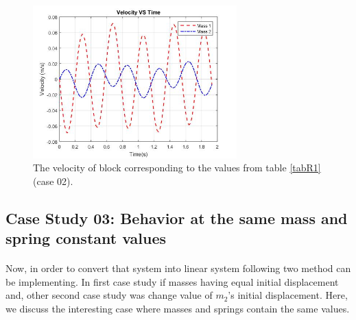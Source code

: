 \begin{figure}[hbt!]
	\centering
	\begin{framed}
	\includegraphics[width=0.7\textwidth]{Figures/R2V.jpg}
		\end{framed}
	\caption{ The velocity of block  corresponding to the values from table \ref{tabR1} (case 02). }
	\label{fig:R4}
\end{figure}

\subsection{Case Study 03: Behavior at the same mass and spring constant values}
\paragraph{}
Now, in order to convert that system into linear system following two method can be implementing. In first case study if
masses having equal initial displacement and, other second case study was change value of $m_2$'s initial displacement. Here, we discuss the interesting case where masses and springs contain the same values.

